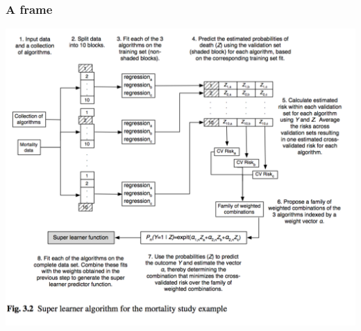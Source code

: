 \documentclass{beamer}
\begin{document}
\begin{frame}
	\frametitle{A frame}
		\begin{center}
    			\includegraphics[scale=0.45]{../paper/figs/SuperLearn2.png}
		\end{center}
\end{frame}
\end{document}
